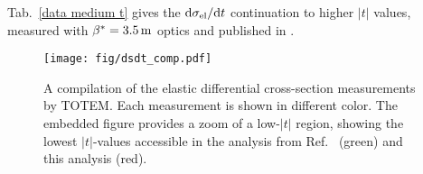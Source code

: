 \documentclass[doublecol]{../macros/epl2}
\def\d{{\rm d}}
\def\un#1{\,{\rm #1}}
\begin{document}
Tab.~\ref{data medium t} gives the $\d\sigma_{\rm el}/\d t$ continuation to higher $|t|$ values, measured with $\beta^* = 3.5\un{m}$ optics and published in \cite{epl95}.


\begin{figure*}
\begin{center}
\texttt{[image: fig/dsdt\_comp.pdf]}
\vskip-5mm
\caption{A compilation of the elastic differential cross-section measurements by TOTEM. Each measurement is shown in different color. The embedded figure provides a zoom of a low-$|t|$ region, showing the lowest $|t|$-values accessible in the analysis from Ref.~\cite{epl96} (green) and this analysis (red).}
\label{dsdt}
\end{center}
\end{figure*}

\setlength{\tabcolsep}{3.8pt}
\end{document}
